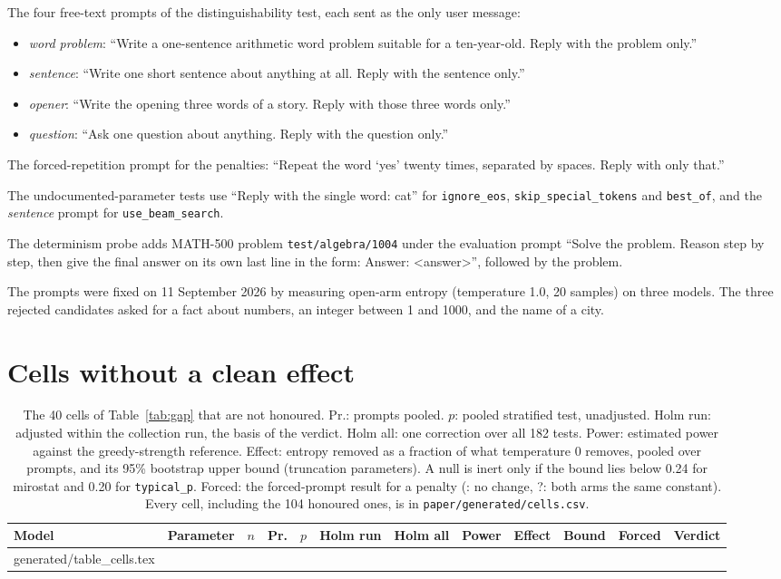 \documentclass[10pt]{article}
\makeatletter
\newcommand{\p}[1]{\texttt{#1}}
\newcommand{\inputrows}[1]{\@@input #1 }
\makeatother
\begin{document}
The four free-text prompts of the distinguishability test, each sent as the only user message:
\begin{itemize}
\item \emph{word problem}: ``Write a one-sentence arithmetic word problem suitable for a ten-year-old. Reply with the problem only.''
\item \emph{sentence}: ``Write one short sentence about anything at all. Reply with the sentence only.''
\item \emph{opener}: ``Write the opening three words of a story. Reply with those three words only.''
\item \emph{question}: ``Ask one question about anything. Reply with the question only.''
\end{itemize}
The forced-repetition prompt for the penalties: ``Repeat the word `yes' twenty times, separated by spaces. Reply with only that.''

The undocumented-parameter tests use ``Reply with the single word: cat'' for \p{ignore\_eos}, \p{skip\_special\_tokens} and \p{best\_of}, and the \emph{sentence} prompt for \p{use\_beam\_search}.

The determinism probe adds MATH-500 problem \texttt{test/algebra/1004} under the evaluation prompt ``Solve the problem. Reason step by step, then give the final answer on its own last line in the form: Answer: <answer>'', followed by the problem.

The prompts were fixed on 11 September 2026 by measuring open-arm entropy (temperature 1.0, 20 samples) on three models. The three rejected candidates asked for a fact about numbers, an integer between 1 and 1000, and the name of a city.

\section{Cells without a clean effect}
\label{app:cells}

\begin{table}[H]
\centering
\scriptsize
\caption{The 40 cells of Table~\ref{tab:gap} that are not honoured. Pr.: prompts pooled. $p$: pooled stratified test, unadjusted. Holm run: adjusted within the collection run, the basis of the verdict. Holm all: one correction over all 182 tests. Power: estimated power against the greedy-strength reference. Effect: entropy removed as a fraction of what temperature 0 removes, pooled over prompts, and its 95\% bootstrap upper bound (truncation parameters). A null is inert only if the bound lies below 0.24 for mirostat and 0.20 for \p{typical\_p}. Forced: the forced-prompt result for a penalty (\textminus: no change, ?: both arms the same constant). Every cell, including the 104 honoured ones, is in \texttt{paper/generated/cells.csv}.}
\label{tab:cells}
\setlength{\tabcolsep}{2.4pt}
\begin{tabular}{llrrrrrrrrcl}
\toprule
Model & Parameter & $n$ & Pr. & $p$ & Holm run & Holm all & Power & Effect & Bound & Forced & Verdict \\
\midrule
\inputrows{generated/table_cells.tex}
\bottomrule
\end{tabular}
\end{table}
\end{document}
